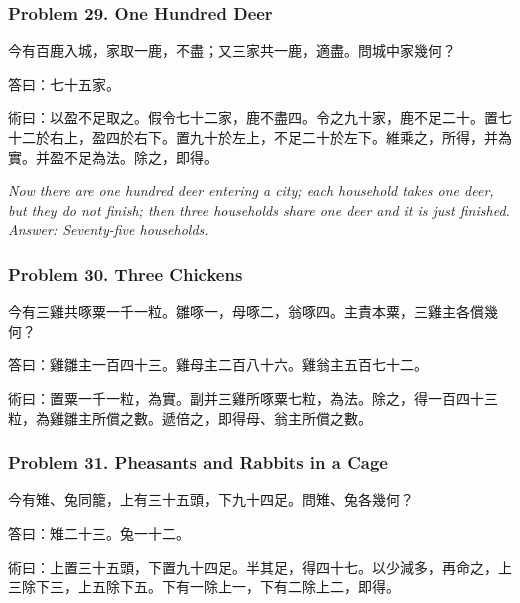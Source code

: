 \documentclass[11pt,a4paper]{article}
\newcommand{\zh}[1]{{\CJKfamily{}#1}}
\begin{document}
\subsubsection*{Problem 29. One Hundred Deer}

\begin{problembox}[title=\zh{問}]
\zh{今有百鹿入城，家取一鹿，不盡；又三家共一鹿，適盡。問城中家幾何？}
\end{problembox}
\begin{answerbox}[title=\zh{答}]
\zh{答曰：七十五家。}
\end{answerbox}
\begin{methodbox}[title=\zh{術}]
\zh{術曰：以盈不足取之。假令七十二家，鹿不盡四。令之九十家，鹿不足二十。置七十二於右上，盈四於右下。置九十於左上，不足二十於左下。維乘之，所得，并為實。并盈不足為法。除之，即得。}
\end{methodbox}

\textit{Now there are one hundred deer entering a city; each household takes one deer, but they do not finish; then three households share one deer and it is just finished. Answer: Seventy-five households.}

\subsubsection*{Problem 30. Three Chickens}

\begin{problembox}[title=\zh{問}]
\zh{今有三雞共啄粟一千一粒。雛啄一，母啄二，翁啄四。主責本粟，三雞主各償幾何？}
\end{problembox}
\begin{answerbox}[title=\zh{答}]
\zh{答曰：雞雛主一百四十三。雞母主二百八十六。雞翁主五百七十二。}
\end{answerbox}
\begin{methodbox}[title=\zh{術}]
\zh{術曰：置粟一千一粒，為實。副并三雞所啄粟七粒，為法。除之，得一百四十三粒，為雞雛主所償之數。遞倍之，即得母、翁主所償之數。}
\end{methodbox}

\subsubsection*{Problem 31. Pheasants and Rabbits in a Cage}

\begin{problembox}[title=\zh{問}]
\zh{今有雉、兔同籠，上有三十五頭，下九十四足。問雉、兔各幾何？}
\end{problembox}
\begin{answerbox}[title=\zh{答}]
\zh{答曰：雉二十三。兔一十二。}
\end{answerbox}
\begin{methodbox}[title=\zh{術}]
\zh{術曰：上置三十五頭，下置九十四足。半其足，得四十七。以少減多，再命之，上三除下三，上五除下五。下有一除上一，下有二除上二，即得。}
\end{methodbox}
\end{document}
